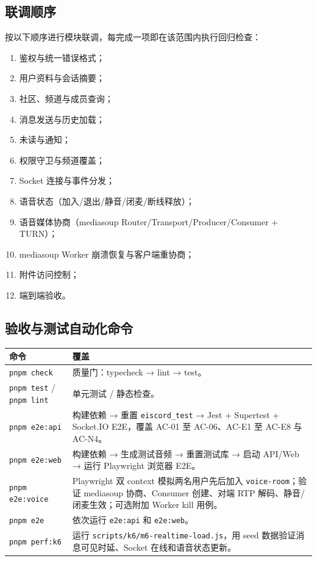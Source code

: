 \subsection{联调顺序}

按以下顺序进行模块联调，每完成一项即在该范围内执行回归检查：

\begin{enumerate}
  \item 鉴权与统一错误格式；
  \item 用户资料与会话摘要；
  \item 社区、频道与成员查询；
  \item 消息发送与历史加载；
  \item 未读与通知；
  \item 权限守卫与频道覆盖；
  \item Socket 连接与事件分发；
  \item 语音状态（加入/退出/静音/闭麦/断线释放）；
  \item 语音媒体协商（mediasoup Router/Transport/Producer/Consumer + TURN）；
  \item mediasoup Worker 崩溃恢复与客户端重协商；
  \item 附件访问控制；
  \item 端到端验收。
\end{enumerate}

\subsection{验收与测试自动化命令}

\noindent\begin{tabularx}{\textwidth}{L{3.4cm}Y}
  \toprule
  命令 & 覆盖 \\
  \midrule
  \texttt{pnpm check} & 质量门：typecheck → lint → test。 \\
  \texttt{pnpm test} / \texttt{pnpm lint} & 单元测试 / 静态检查。 \\
  \texttt{pnpm e2e:api} & 构建依赖 → 重置 \texttt{eiscord\_test} → Jest + Supertest + Socket.IO E2E，覆盖 AC-01 至 AC-06、AC-E1 至 AC-E8 与 AC-N4。 \\
  \texttt{pnpm e2e:web} & 构建依赖 → 生成测试音频 → 重置测试库 → 启动 API/Web → 运行 Playwright 浏览器 E2E。 \\
  \texttt{pnpm e2e:voice} & Playwright 双 context 模拟两名用户先后加入 \texttt{voice-room}；验证 mediasoup 协商、Consumer 创建、对端 RTP 解码、静音/闭麦生效；可选附加 Worker kill 用例。 \\
  \texttt{pnpm e2e} & 依次运行 \texttt{e2e:api} 和 \texttt{e2e:web}。 \\
  \texttt{pnpm perf:k6} & 运行 \texttt{scripts/k6/m6-realtime-load.js}，用 seed 数据验证消息可见时延、Socket 在线和语音状态更新。 \\
  \bottomrule
\end{tabularx}


